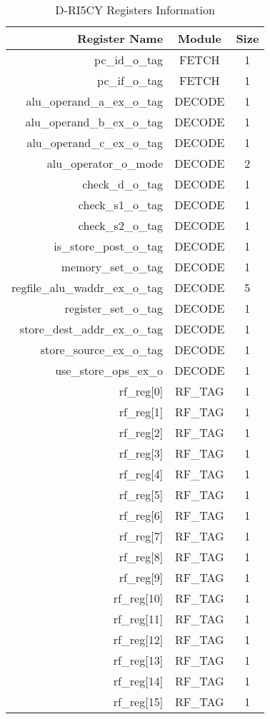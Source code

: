 \begin{table}
\caption{D-RI5CY Registers Information}
\label{tab:driscy_register_info}
\begin{tabular}{rcc}
\toprule
Register Name & Module & Size \\
\midrule
pc\_id\_o\_tag & FETCH & 1 \\
pc\_if\_o\_tag & FETCH & 1 \\
alu\_operand\_a\_ex\_o\_tag & DECODE & 1 \\
alu\_operand\_b\_ex\_o\_tag & DECODE & 1 \\
alu\_operand\_c\_ex\_o\_tag & DECODE & 1 \\
alu\_operator\_o\_mode & DECODE & 2 \\
check\_d\_o\_tag & DECODE & 1 \\
check\_s1\_o\_tag & DECODE & 1 \\
check\_s2\_o\_tag & DECODE & 1 \\
is\_store\_post\_o\_tag & DECODE & 1 \\
memory\_set\_o\_tag & DECODE & 1 \\
regfile\_alu\_waddr\_ex\_o\_tag & DECODE & 5 \\
register\_set\_o\_tag & DECODE & 1 \\
store\_dest\_addr\_ex\_o\_tag & DECODE & 1 \\
store\_source\_ex\_o\_tag & DECODE & 1 \\
use\_store\_ops\_ex\_o & DECODE & 1 \\
rf\_reg[0] & RF\_TAG & 1 \\
rf\_reg[1] & RF\_TAG & 1 \\
rf\_reg[2] & RF\_TAG & 1 \\
rf\_reg[3] & RF\_TAG & 1 \\
rf\_reg[4] & RF\_TAG & 1 \\
rf\_reg[5] & RF\_TAG & 1 \\
rf\_reg[6] & RF\_TAG & 1 \\
rf\_reg[7] & RF\_TAG & 1 \\
rf\_reg[8] & RF\_TAG & 1 \\
rf\_reg[9] & RF\_TAG & 1 \\
rf\_reg[10] & RF\_TAG & 1 \\
rf\_reg[11] & RF\_TAG & 1 \\
rf\_reg[12] & RF\_TAG & 1 \\
rf\_reg[13] & RF\_TAG & 1 \\
rf\_reg[14] & RF\_TAG & 1 \\
rf\_reg[15] & RF\_TAG & 1 \\

\end{tabular}
\end{table}
